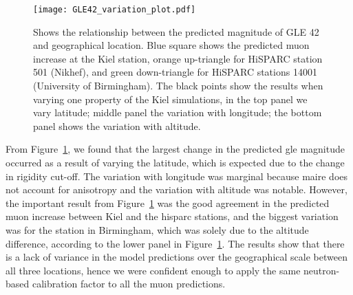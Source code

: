 \begin{figure}[ht!]
	\centering
	\texttt{[image: GLE42\_variation\_plot.pdf]}
	\caption{Shows the relationship between the predicted magnitude of GLE 42 and geographical location. Blue square shows the predicted muon increase at the Kiel station, orange up-triangle for HiSPARC station 501 (Nikhef), and green down-triangle for HiSPARC stations 14001 (University of Birmingham). The black points show the results when varying one property of the Kiel simulations, in the top panel we vary latitude; middle panel the variation with longitude; the bottom panel shows the variation with altitude.}
	\label{fig:GLE42_MAIRE_test}
\end{figure}


From Figure~\ref{fig:GLE42_MAIRE_test}, we found that the largest change in the predicted \gls{gle} magnitude occurred as a result of varying the latitude, which is expected due to the change in rigidity cut-off. The variation with longitude was marginal because \gls{maire} does not account for anisotropy and the variation with altitude was notable. However, the important result from Figure~\ref{fig:GLE42_MAIRE_test} was the good agreement in the predicted muon increase between Kiel and the \gls{hisparc} stations, and the biggest variation was for the station in Birmingham, which was solely due to the altitude difference, according to the lower panel in Figure~\ref{fig:GLE42_MAIRE_test}. The results show that there is a lack of variance in the model predictions over the geographical scale between all three locations, hence we were confident enough to apply the same neutron-based calibration factor to all the muon predictions.


